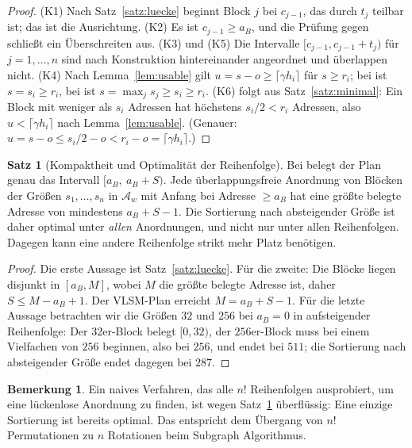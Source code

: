 \documentclass[a4paper,12pt, twoside]{report}
\theoremstyle{definition}
\newtheorem{satz}{Satz}
\newtheorem{bemerkung}{Bemerkung}
\newcommand{\code}[1]{\texttt{\detokenize{#1}}}
\begin{document}
\begin{proof}
	(K1) Nach Satz~\ref{satz:luecke} beginnt Block $j$ bei $c_{j-1}$, das durch $t_j$ teilbar ist; das ist die Ausrichtung. (K2) Es ist $c_{j-1} \ge a_B$, und die Prüfung gegen \code{end} schließt ein Überschreiten aus. (K3) und (K5) Die Intervalle $[c_{j-1}, c_{j-1}+t_j)$ für $j=1,\ldots,n$ sind nach Konstruktion hintereinander angeordnet und überlappen nicht. (K4) Nach Lemma~\ref{lem:usable} gilt $u = s - o \ge \lceil\gamma h_i\rceil$ für $s \ge r_i$; bei \code{vlsm} ist $s = s_i \ge r_i$, bei \code{fixed} ist $s = \max_j s_j \ge s_i \ge r_i$. (K6) folgt aus Satz~\ref{satz:minimal}: Ein Block mit weniger als $s_i$ Adressen hat höchstens $s_i/2 < r_i$ Adressen, also $u < \lceil\gamma h_i\rceil$ nach Lemma~\ref{lem:usable}. (Genauer: $u = s - o \le s_i/2 - o < r_i - o = \lceil\gamma h_i\rceil$.)
\end{proof}

\begin{satz}[Kompaktheit und Optimalität der Reihenfolge]
\label{satz:kompakt}
	Bei \code{vlsm} belegt der Plan genau das Intervall $[a_B,\ a_B+S)$. Jede überlappungsfreie Anordnung von Blöcken der Größen $s_1,\ldots,s_n$ in $\mathcal{A}_w$ mit Anfang bei Adresse $\ge a_B$ hat eine größte belegte Adresse von mindestens $a_B + S - 1$. Die Sortierung nach absteigender Größe ist daher optimal unter \emph{allen} Anordnungen, und nicht nur unter allen Reihenfolgen. Dagegen kann eine andere Reihenfolge strikt mehr Platz benötigen.
\end{satz}

\begin{proof}
	Die erste Aussage ist Satz~\ref{satz:luecke}. Für die zweite: Die Blöcke liegen disjunkt in $[a_B, M]$, wobei $M$ die größte belegte Adresse ist, daher $S \le M - a_B + 1$. Der VLSM-Plan erreicht $M = a_B+S-1$. Für die letzte Aussage betrachten wir die Größen $32$ und $256$ bei $a_B = 0$ in aufsteigender Reihenfolge: Der $32$er-Block belegt $[0,32)$, der $256$er-Block muss bei einem Vielfachen von $256$ beginnen, also bei $256$, und endet bei $511$; die Sortierung nach absteigender Größe endet dagegen bei $287$.
\end{proof}

\begin{bemerkung}
	Ein naives Verfahren, das alle $n!$ Reihenfolgen ausprobiert, um eine lückenlose Anordnung zu finden, ist wegen Satz~\ref{satz:kompakt} überflüssig: Eine einzige Sortierung ist bereits optimal. Das entspricht dem Übergang von $n!$ Permutationen zu $n$ Rotationen beim Subgraph Algorithmus.
\end{bemerkung}
\end{document}
